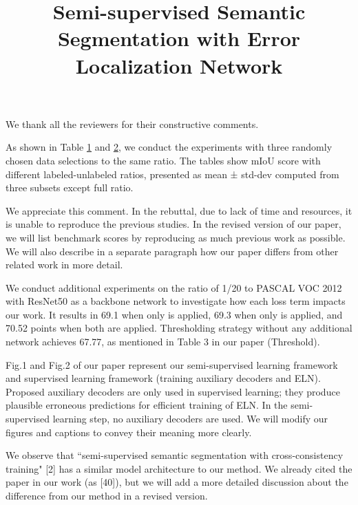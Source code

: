 \documentclass[10pt,twocolumn,letterpaper]{article}
\begin{document}
\title{Semi-supervised Semantic Segmentation with Error Localization Network}  

\maketitle
\thispagestyle{empty}

We thank all the reviewers for their constructive comments. 

As shown in Table \hyperref[sec:avg-res-pascal]{1} and \hyperref[sec:avg-res-city]{2}, we conduct the experiments with three randomly chosen data selections to the same ratio. The tables show mIoU score with different labeled-unlabeled ratios, presented as mean ± std-dev computed from three subsets except full ratio.

 We appreciate this comment. In the rebuttal, due to lack of time and resources, it is unable to reproduce the previous studies. In the revised version of our paper, we will list benchmark scores by reproducing as much previous work as possible. We will also describe in a separate paragraph how our paper differs from other related work in more detail.

 We conduct additional experiments on the ratio of 1/20 to PASCAL VOC 2012 with ResNet50 as a backbone network to investigate how each loss term impacts our work.  
It results in 69.1 when only  is applied, 69.3 when only  is applied, and 70.52 points when both are applied. Thresholding strategy without any additional network achieves 67.77, as mentioned in Table 3 in our paper (Threshold). 

Fig.1 and Fig.2 of our paper represent our semi-supervised learning framework and supervised learning framework (training auxiliary decoders and ELN). Proposed auxiliary decoders are only used in supervised learning; they produce plausible erroneous predictions for efficient training of ELN. In the semi-supervised learning step, no auxiliary decoders are used. We will modify our figures and captions to convey their meaning more clearly.

 We observe that ``semi-supervised semantic segmentation with cross-consistency training" [2] has a similar model architecture to our method. We already cited the paper in our work (as [40]), but we will add a more detailed discussion about the difference from our method in a revised version.
\end{document}
